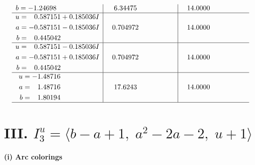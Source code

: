 \documentclass[1p]{elsarticle_modified}
\theoremstyle{definition}
\begin{document}
$$\begin{array}{c|c|c}
\begin{aligned}
b &= -1.24698\phantom{ +0.000000I}\end{aligned}
 & \phantom{-}6.34475\phantom{ +0.000000I} & \phantom{-}14.0000\phantom{ +0.000000I} \\ \hline\begin{aligned}
u &= \phantom{-}0.587151 + 0.185036 I \\
a &= -0.587151 - 0.185036 I \\
b &= \phantom{-}0.445042\phantom{ +0.000000I}\end{aligned}
 & \phantom{-}0.704972\phantom{ +0.000000I} & \phantom{-}14.0000\phantom{ +0.000000I} \\ \hline\begin{aligned}
u &= \phantom{-}0.587151 - 0.185036 I \\
a &= -0.587151 + 0.185036 I \\
b &= \phantom{-}0.445042\phantom{ +0.000000I}\end{aligned}
 & \phantom{-}0.704972\phantom{ +0.000000I} & \phantom{-}14.0000\phantom{ +0.000000I} \\ \hline\begin{aligned}
u &= -1.48716\phantom{ +0.000000I} \\
a &= \phantom{-}1.48716\phantom{ +0.000000I} \\
b &= \phantom{-}1.80194\phantom{ +0.000000I}\end{aligned}
 & \phantom{-}17.6243\phantom{ +0.000000I} & \phantom{-}14.0000\phantom{ +0.000000I}\\
 \hline 
 \end{array}$$\newpage\newpage\renewcommand{\arraystretch}{1}
\centering \section*{III. $I^u_{3}= \langle b- a+1,\;a^2-2 a-2,\;u+1 \rangle$}
\flushleft \textbf{(i) Arc colorings}\\
\end{document}
